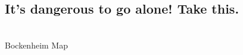 \documentclass[12pt,a4paper]{scrartcl}
\begin{document}
\subsection*{ It's dangerous to go alone! Take this. }
    \vspace{2.5cm}
    \begin{center}
    \\Bockenheim Map
    \end{center}
    \pagebreak
\end{document}
